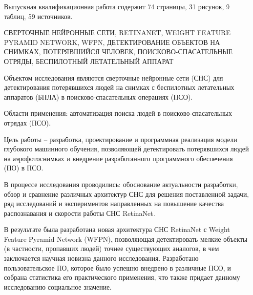 \documentclass[a4paper,14pt]{extarticle} %
\begin{document}
Выпускная квалификационная работа содержит 74 страницы, 31 рисунок, 9 таблиц, 59 источников.

\MakeUppercase{сверточные нейронные сети, RetinaNet, Weight Feature Pyramid Network, WFPN, детектирование объектов на снимках, потерявшийся человек, поисково-спасательные отряды, беспилотный летательный аппарат}

Объектом исследования являются сверточные нейронные сети (СНС) для детектирования потерявшихся людей на снимках с беспилотных летательных аппаратов (БПЛА) в поисково-спасательных операциях (ПСО).

Области применения: автоматизация поиска людей в поисково-спасательных отрядах (ПСО).

Цель работы -- разработка, проектирование и программная реализация модели глубокого машинного обучения, позволяющей детектировать потерявшихся людей на аэрофотоснимках и внедрение разработанного программного обеспечения (ПО) в ПСО.

В процессе исследования проводились: обоснование актуальности разработки, обзор и сравнение различных архитектур СНС для решения поставленной задачи, ряд исследований и экспериментов направленных на повышение качества распознавания и скорости работы СНС RetinaNet.

В результате была разработана новая архитектура СНС RetinaNet с Weight Feature Pyramid Network (WFPN), позволяющая детектировать мелкие объекты (в частности, пропавших людей) точнее существующих аналогов, в чем заключается научная новизна данного исследования. Разработано пользовательское ПО, которое было успешно внедрено в различные ПСО, и собрана статистика его практического применения, что также придает данному исследованию социальное значение.
\end{document}

